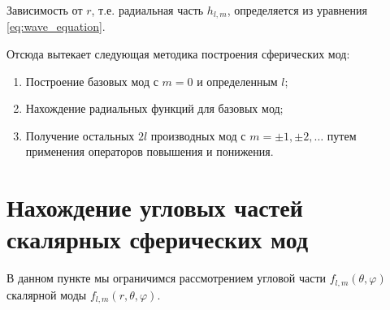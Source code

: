 \documentclass[12pt,a4paper]{article}
\begin{document}
        Зависимость от $r$, т.е. радиальная часть $h_{l, m}$, определяется из уравнения \autoref{eq:wave_equation}.

        Отсюда вытекает следующая методика построения сферических мод:
        \begin{enumerate}[noitemsep]
            \item Построение базовых мод с $m = 0$ и определенным $l$;
            \item Нахождение радиальных функций для базовых мод;
            \item Получение остальных $2l$ производных мод с $m = \pm 1, \pm 2, \dots$ путем применения операторов повышения и понижения.
        \end{enumerate}


    \section{Нахождение угловых частей скалярных сферических мод}

        В данном пункте мы ограничимся рассмотрением угловой части $f_{l,m}(\theta, \varphi)$ скалярной моды $f_{l,m}(r, \theta, \varphi)$.
\end{document}
